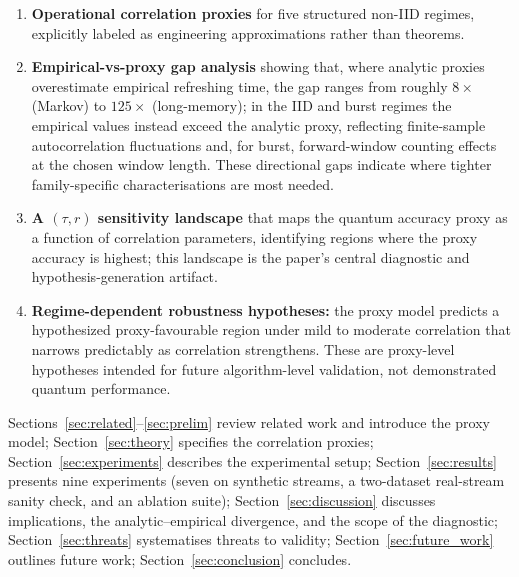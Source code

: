 \documentclass[sensors,article,submit,pdftex,moreauthors]{Definitions/mdpi}
\providecommand{\DIFadd}[1]{{\protect\color{blue}#1}} %
\providecommand{\DIFdel}[1]{} %
\providecommand{\DIFaddbegin}{} %
\providecommand{\DIFaddend}{} %
\providecommand{\DIFdelbegin}{} %
\providecommand{\DIFdelend}{} %
\begin{document}
\begin{enumerate}
    \item \textbf{Operational correlation proxies} for five structured non\nobreakdash-IID regimes, explicitly labeled as engineering approximations rather than theorems.

    \item \textbf{Empirical-vs-proxy gap analysis} showing that, where analytic proxies overestimate empirical refreshing time, the gap ranges from roughly $8\times$ (Markov) to $125\times$ (long-memory); in the IID and burst regimes the empirical values instead exceed the analytic proxy, reflecting finite\nobreakdash-sample autocorrelation fluctuations and, for burst, forward\nobreakdash-window counting effects at the chosen window length. These directional gaps indicate where tighter family-specific characterisations are most needed.

    \item \textbf{A $(\tau, r)$ sensitivity landscape} that maps the quantum accuracy proxy as a function of correlation parameters, identifying regions where the proxy accuracy is highest\DIFdelbegin \DIFdel{and which can serve as a diagnostic map for proxy-side sensitivity analysis}\DIFdelend \DIFaddbegin \DIFadd{; this landscape is the paper's central diagnostic and hypothesis-generation artifact}\DIFaddend .

    \item \textbf{Regime-dependent robustness \DIFdelbegin \DIFdel{trends}\DIFdelend \DIFaddbegin \DIFadd{hypotheses}\DIFaddend :} the proxy model \DIFdelbegin \DIFdel{suggests a favourable }\DIFdelend \DIFaddbegin \DIFadd{predicts a hypothesized proxy-favourable }\DIFaddend region under mild to moderate correlation that narrows predictably as correlation strengthens. \DIFaddbegin \DIFadd{These are proxy-level hypotheses intended for future algorithm-level validation, not demonstrated quantum performance.
}\DIFaddend \end{enumerate}

Sections~\ref{sec:related}--\ref{sec:prelim} review related work and introduce the proxy model; Section~\ref{sec:theory} specifies the correlation proxies; Section~\ref{sec:experiments} describes the experimental setup; Section~\ref{sec:results} presents nine experiments (seven on synthetic streams, a two\nobreakdash-dataset real-stream sanity check, and an ablation suite); Section~\ref{sec:discussion} discusses implications\DIFdelbegin \DIFdel{and limitations}\DIFdelend \DIFaddbegin \DIFadd{, the analytic--empirical divergence, and the scope of the diagnostic}\DIFaddend ; Section~\DIFaddbegin \DIFadd{\ref{sec:threats} systematises threats to validity; Section~\ref{sec:future_work} outlines future work; Section~}\DIFaddend \ref{sec:conclusion} concludes.
\end{document}
